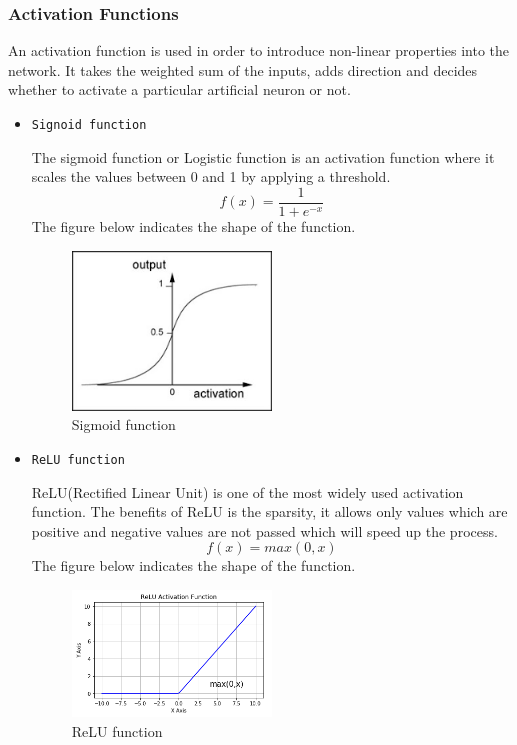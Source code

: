 \documentclass[a4paper,10pt]{article}
\begin{document}
  \subsubsection{Activation Functions}
  \quad An activation function is used in order to introduce non-linear properties into the network. It takes the weighted sum of the inputs, adds direction and decides whether to activate a particular artificial neuron or not.
  \begin{itemize}
  	\item \texttt{Signoid function}
  	
  	 \quad The sigmoid function or Logistic function is an activation function where it scales the values between 0 and 1 by applying a threshold. 
  	 $$ f (x) =  \frac{\mathrm{1} }{\mathrm{1} + e^{-x} }  $$ 
  	 \quad The figure below indicates the shape of the function. 
  	\begin{figure}[!htbp]
  		\centering
  		\includegraphics[width=0.5\textwidth]{sigmoid.png}
  		\caption{Sigmoid function}
  	\end{figure}
  \vspace{5mm} %
  
  	\vspace{5mm} %
 	\item \texttt{ReLU function}
 	
 	\quad ReLU(Rectified Linear Unit)  is one of the most widely used activation function. The benefits of ReLU is the sparsity, it allows only values which are positive and negative values are not passed which will speed up the process. 
 	$$ f (x) =  max(0,x)  $$ 
 	\quad The figure below indicates the shape of the function. 
 	\begin{figure}[!htbp]
 		\centering
 		\includegraphics[width=0.5\textwidth]{relu.png}
 		\caption{ReLU function}
 	\end{figure}
 	

\end{itemize}
\end{document}
